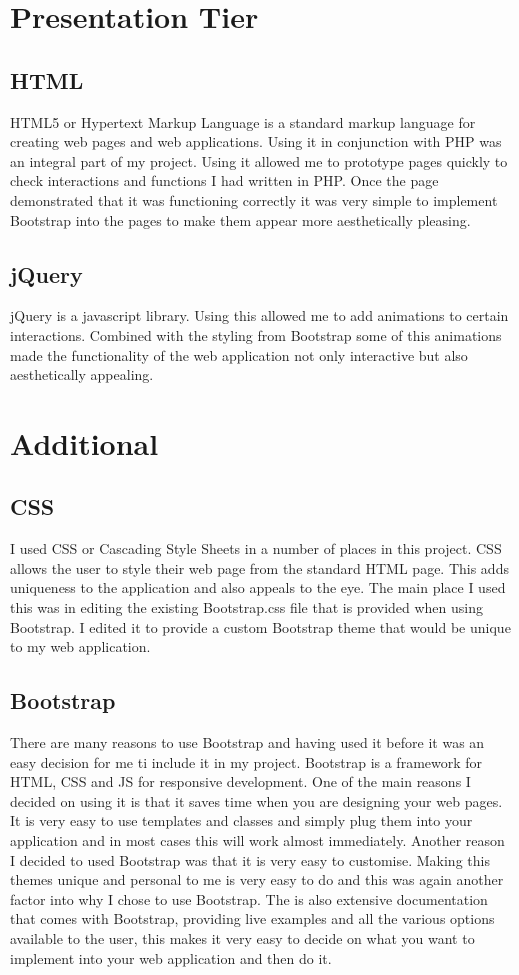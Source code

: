 \section{Presentation Tier}
\subsection{HTML}
HTML5 or Hypertext Markup Language is a standard markup language for creating web pages and web applications. Using it in conjunction with PHP was an integral part of my project. Using it allowed me to prototype pages quickly to check interactions and functions I had written in PHP. Once the page demonstrated that it was functioning correctly it was very simple to implement Bootstrap into the pages to make them appear more aesthetically pleasing.

\subsection{jQuery}
jQuery is a javascript library. Using this allowed me to add animations to certain interactions. Combined with the styling from Bootstrap some of this animations made the functionality of the web application not only interactive but also aesthetically appealing.

\section{Additional}
\subsection{CSS}
I used CSS or Cascading Style Sheets in a number of places in this project. CSS allows the user to style their web page from the standard HTML page. This adds uniqueness to the application and also appeals to the eye. The main place I used this was in editing the existing Bootstrap.css file that is provided when using Bootstrap. I edited it to provide a custom Bootstrap theme that would be unique to my web application.

\subsection{Bootstrap}
There are many reasons to use Bootstrap and having used it before it was an easy decision for me ti include it in my project. Bootstrap is a framework for HTML, CSS and JS for responsive development.  One of the main reasons I decided on using it is that it saves time when you are designing your web pages. It is very easy to use templates and classes and simply plug them into your application and in most cases this will work almost immediately. Another reason I decided to used Bootstrap was that it is very easy to customise. Making this themes unique and personal to me is very easy to do and this was again another factor into why I chose to use Bootstrap. The is also extensive documentation that comes with Bootstrap, providing live examples and all the various options available to the user, this makes it very easy to decide on what you want to implement into your web application and then do it. 

